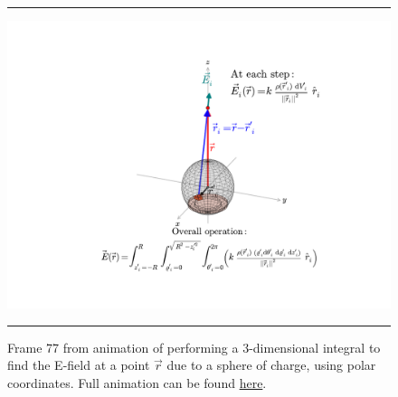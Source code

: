\documentclass[10pt,letterpaper,twoside]{article}
\begin{document}
\begin{figure}[htb]
  \centering
  \vspace{5pt}
  \hrule%
  \vspace{10pt}
	\centering
	\includegraphics[clip=true,trim=1.9in 0.5in 1.4in 0.7in,keepaspectratio=true,width=\columnwidth]{./frame0077_iso.pdf}
	\caption{Frame 77 from animation of performing a 3-dimensional integral to find the E-field at a point $\vec r$ due to a sphere of charge, using polar coordinates.
	Full animation can be found \href{http://www.personal.psu.edu/jll1062/Documents/visual_coulomb_integral.avi}{here}.}
    \label{fig:visual_coulomb_integral}
  \hrule%
\vspace{5pt}
\end{figure}
\end{document}
